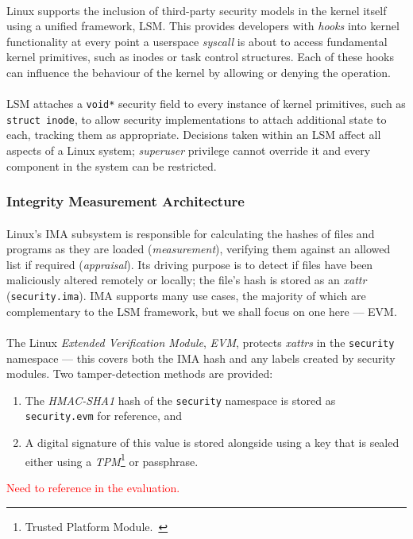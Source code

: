 \paragraph{} Linux supports the inclusion of third-party security models in the kernel itself using a unified framework, LSM. This provides developers with \textit{hooks} into kernel functionality at every point a userspace \textit{syscall} is about to access fundamental kernel primitives, such as inodes or task control structures. Each of these hooks can influence the behaviour of the kernel by allowing or denying the operation.

\paragraph{} LSM attaches a \texttt{void*} security field to every instance of kernel primitives, such as \texttt{struct inode}, to allow security implementations to attach additional state to each, tracking them as appropriate. Decisions taken within an LSM affect all aspects of a Linux system; \textit{superuser} privilege cannot override it and every component in the system can be restricted.


\subsubsection{Integrity Measurement Architecture}

\paragraph{} Linux's IMA subsystem is responsible for calculating the hashes of files and programs as they are loaded (\textit{measurement}), verifying them against an allowed list if required (\textit{appraisal}). Its driving purpose is to detect if files have been maliciously altered remotely or locally; the file's hash is stored as an \textit{xattr} (\texttt{security.ima}). IMA supports many use cases, the majority of which are complementary to the LSM framework, but we shall focus on one here --- EVM.

\paragraph{} The Linux \textit{Extended Verification Module}, \textit{EVM}, protects \textit{xattrs} in the \texttt{security} namespace --- this covers both the IMA hash and any labels created by security modules. Two tamper-detection methods are provided:

\begin{enumerate}
    \item The \textit{HMAC-SHA1} hash of the \texttt{security} namespace is stored as \texttt{security.evm} for reference, and
    \item A digital signature of this value is stored alongside using a key that is sealed either using a \textit{TPM}\footnote{Trusted Platform Module.~\cite{tpm}} or passphrase.
\end{enumerate}

\textcolor{red}{Need to reference in the evaluation.}